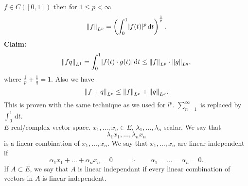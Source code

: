 \begin{bemerkung}
	$f \in C([0,1])$ then for $1 \leq p < \infty$
	\[
		\norm{f}_{L^p} = \left( \int_{0}^{1} \abs{f(t)}^p \,\mathrm{d}t \right)^{\frac{1}{p}}.
	\]
	\textbf{Claim:} \text{    }     
	\begin{align*}
		\norm{fq}_{L^1} = \int_{0}^{1} \abs{f(t)\cdot g(t)} \,\mathrm{d}t \leq \norm{f}_{L^p} \cdot \norm{g}_{L^q},
	\end{align*}
	where $\frac{1}{p}+ \frac{1}{q}= 1$. Also we have
	\[
		\norm{f+q}_{L^p} \leq \norm{f}_{L^p}+ \norm{g}_{L^p}.
	\]
	This is proven with the same technique as we used for $l^p$. $\sum_{n=1}^{\infty}$ is replaced by $\int_{0}^{1} \,\mathrm{d}t$. \\
	$E$ real/complex vector space. $x_1, \dots,x_n \in E$, $\lambda_1, \dots, \lambda_n$ scalar. We say that 
	\[
		\lambda_1 x_1, \dots, \lambda_n x_n
	\]
	is a linear combination of $x_1,\dots,x_n$. We say that $x_1,\dots,x_n$ are linear independent if 
	\[
		\alpha_1 x_1 + \dots + \alpha_n x_n = 0 \qquad \Rightarrow \qquad \alpha_1 = \dots = \alpha_n = 0.
	\]
	If $A \subset E$, we say that $A$ is linear independant if every linear combination of vectors in $A$ is linear independent.
\end{bemerkung}
